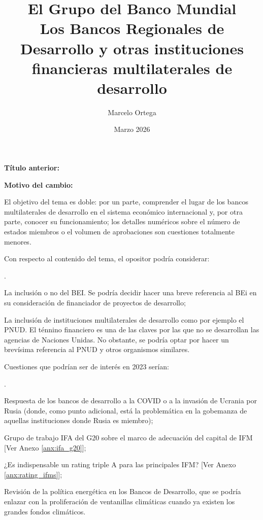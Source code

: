 \documentclass[10pt,a4paper]{article}
\title{El Grupo del Banco Mundial\\
\large Los Bancos Regionales de Desarrollo y otras instituciones financieras multilaterales de desarrollo}
\author{Marcelo Ortega}
\date{Marzo 2026}
\newcounter{numitem}
\newcommand{\puntosclave}[1]{%
  \begin{tcolorbox}[
    colframe=black,
    title={Puntos clave},
    before upper={\setlength{\parindent}{0.5cm}\setlength{\parskip}{0.5\baselineskip}}
  ]
  #1
  \end{tcolorbox}
}
\newenvironment{lnum}
      {\begin{list}{\arabic{numitem}.}{%
          \usecounter{numitem}%
          \setlength{\leftmargin}{1cm}%
          \setlength{\parskip}{3pt}%
          \setlength{\itemsep}{0pt}%
          \setlength{\parsep}{0pt}%
      }}
      {\end{list}}
\newcommand{\changebox}{%
\begin{tcolorbox}[title={Historial de cambios del tema}]
\textbf{Título anterior:} \OldTitle\par
\textbf{Motivo del cambio:} \ChangeWhy
\end{tcolorbox}
}
\begin{document}
\maketitle
\changebox

\newpage

\puntosclave{ %
     El objetivo del tema es doble: por un parte, comprender el lugar de los bancos multilaterales de desarrollo en el sistema económico internacional y, por otra parte, conocer su funcionamiento; los detalles numéricos sobre el número de estados miembros o el volumen de aprobaciones son cuestiones totalmente menores.

     Con respecto al contenido del tema, el opositor podría considerar: 
     \begin{lnum}
         \item La inclusión o no del BEI. Se podría decidir hacer una breve referencia al BEi en su consideración de financiador de proyectos de desarrollo;
         \item La inclusión de instituciones multilaterales de desarrollo como por ejemplo el PNUD. El ténnino financiero es una de las claves por las que no se desarrollan las agencias de Naciones Unidas. No obstante, se podría optar por hacer un brevísima referencia al PNUD y otros organismos similares.
     \end{lnum}

     Cuestiones que podrían ser de interés en 2023 serían: 
     \begin{lnum}
         \item Respuesta de los bancos de desarrollo a la COVID o a la invasión de Ucrania por Rusia (donde, como punto adicional, está la problemática en la gobemanza de aquellas instituciones donde Rusia es miembro);
         \item Grupo de trabajo IFA del G20 sobre el marco de adecuación del capital de IFM [Ver Anexo \ref{anx:ifa_g20}];
         \item ¿Es indispensable un rating triple A para las principales IFM? [Ver Anexo \ref{anx:rating_ifms}];
         \item Revisión de la política energética en los Bancos de Desarrollo, que se podría enlazar con la proliferación de ventanillas climáticas cuando ya existen los grandes fondos climáticos. 
     \end{lnum}
    }
\vspace{1cm}
\end{document}
